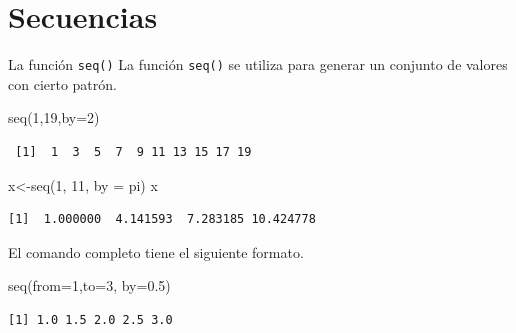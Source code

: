 \documentclass[
  ignorenonframetext,
  aspectratio=169,
  spanish,
]{beamer}
\newenvironment{Shaded}{\begin{snugshade}}{\end{snugshade}}
\newcommand{\AttributeTok}[1]{\textcolor[rgb]{0.40,0.45,0.13}{#1}}
\newcommand{\DecValTok}[1]{\textcolor[rgb]{0.68,0.00,0.00}{#1}}
\newcommand{\FloatTok}[1]{\textcolor[rgb]{0.68,0.00,0.00}{#1}}
\newcommand{\FunctionTok}[1]{\textcolor[rgb]{0.28,0.35,0.67}{#1}}
\newcommand{\NormalTok}[1]{\textcolor[rgb]{0.00,0.23,0.31}{#1}}
\newcommand{\OtherTok}[1]{\textcolor[rgb]{0.00,0.23,0.31}{#1}}
\begin{document}
\section{Secuencias}\label{secuencias}

\begin{frame}[fragile]{La función \texttt{seq()}}
\label{la-funciuxf3n-seq}
La función \texttt{seq()} se utiliza para generar un conjunto de valores
con cierto patrón.

\begin{Shaded}
\begin{Highlighting}[]
\FunctionTok{seq}\NormalTok{(}\DecValTok{1}\NormalTok{,}\DecValTok{19}\NormalTok{,}\AttributeTok{by=}\DecValTok{2}\NormalTok{)}
\end{Highlighting}
\end{Shaded}

\begin{verbatim}
 [1]  1  3  5  7  9 11 13 15 17 19
\end{verbatim}

\begin{Shaded}
\begin{Highlighting}[]
\NormalTok{x}\OtherTok{\textless{}{-}}\FunctionTok{seq}\NormalTok{(}\DecValTok{1}\NormalTok{, }\DecValTok{11}\NormalTok{, }\AttributeTok{by =}\NormalTok{ pi) }
\NormalTok{x}
\end{Highlighting}
\end{Shaded}

\begin{verbatim}
[1]  1.000000  4.141593  7.283185 10.424778
\end{verbatim}

El comando completo tiene el siguiente formato.

\begin{Shaded}
\begin{Highlighting}[]
\FunctionTok{seq}\NormalTok{(}\AttributeTok{from=}\DecValTok{1}\NormalTok{,}\AttributeTok{to=}\DecValTok{3}\NormalTok{, }\AttributeTok{by=}\FloatTok{0.5}\NormalTok{)}
\end{Highlighting}
\end{Shaded}

\begin{verbatim}
[1] 1.0 1.5 2.0 2.5 3.0
\end{verbatim}
\end{frame}
\end{document}
